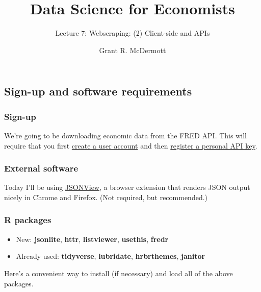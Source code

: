 \documentclass[
]{article}
\title{Data Science for Economists}
\subtitle{Lecture 7: Webscraping: (2) Client-side and APIs}
\author[]{Grant R. McDermott}
\affil{University
of Oregon \textbar{} \href{https://github.com/uo-ec607/lectures}{EC
607}}
\date{}
\providecommand{\tightlist}{%
  \setlength{\itemsep}{0pt}\setlength{\parskip}{0pt}}
\begin{document}
\maketitle

{
\hypersetup{linkcolor=}
\setcounter{tocdepth}{2}
\tableofcontents
}
\hypertarget{sign-up-and-software-requirements}{%
\subsection{Sign-up and software
requirements}\label{sign-up-and-software-requirements}}

\hypertarget{sign-up}{%
\subsubsection{Sign-up}\label{sign-up}}

We're going to be downloading economic data from the FRED API. This will
require that you first
\href{https://research.stlouisfed.org/useraccount/apikey}{create a user
account} and then
\href{https://research.stlouisfed.org/useraccount/apikey}{register a
personal API key}.

\hypertarget{external-software}{%
\subsubsection{External software}\label{external-software}}

Today I'll be using \href{https://jsonview.com/}{JSONView}, a browser
extension that renders JSON output nicely in Chrome and Firefox. (Not
required, but recommended.)

\hypertarget{r-packages}{%
\subsubsection{R packages}\label{r-packages}}

\begin{itemize}
\tightlist
\item
  New: \textbf{jsonlite}, \textbf{httr}, \textbf{listviewer},
  \textbf{usethis}, \textbf{fredr}
\item
  Already used: \textbf{tidyverse}, \textbf{lubridate},
  \textbf{hrbrthemes}, \textbf{janitor}
\end{itemize}

Here's a convenient way to install (if necessary) and load all of the
above packages.
\end{document}
